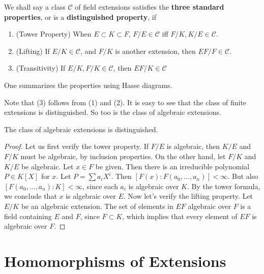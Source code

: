 We shall say a class $\mathcal{C}$ of field extensions satisfies the {\bf three standard properties}, or is a {\bf distinguished property}, if
%
\begin{enumerate}
    \item (Tower Property) When $E \subset K \subset F$, $F/E \in \mathcal{C}$ iff $F/K,K/E \in \mathcal{C}$.
    \item (Lifting) If $E/K \in \mathcal{C}$, and $F/K$ is another extension, then $EF/F \in \mathcal{C}$.
    \item (Transitivity) If $E/K, F/K \in \mathcal{C}$, then $EF/K \in \mathcal{C}$
\end{enumerate}
%
One summarizes the properties using Hasse diagrams.
%
\begin{center}
\end{center}
%
Note that (3) follows from (1) and (2). It is easy to see that the class of finite extensions is distinguished. So too is the class of algebraic extensions.

\begin{theorem}
    The class of algebraic extensions is distinguished.
\end{theorem}
\begin{proof}
    Let us first verify the tower property. If $F/E$ is algebraic, then $K/E$ and $F/K$ must be algebraic, by inclusion properties. On the other hand, let $F/K$ and $K/E$ be algebraic. Let $x \in F$ be given. Then there is an irreducible polynomial $P \in K[X]$ for $x$. Let $P = \sum a_i X^i$. Then $[F(x): F(a_0, \dots, a_n)] < \infty$. But also $[F(a_0, \dots, a_n): K] < \infty$, since each $a_i$ is algebraic over $K$. By the tower formula, we conclude that $x$ is algebraic over $E$. Now let's verify the lifting property. Let $E/K$ be an algebraic extension. The set of elements in $EF$ algebraic over $F$ is a field containing $E$ and $F$, since $F \subset K$, which implies that every element of $EF$ is algebraic over $F$.
\end{proof}

\section{Homomorphisms of Extensions}

